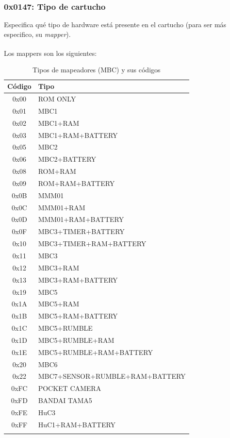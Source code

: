 \subsubsection{0x0147: Tipo de cartucho}
Especifica qué tipo de hardware está presente en el cartucho (para ser más especifico, su \textit{mapper}).
\\\\
Los mappers son los siguientes:
\begin{longtable}{|c|l|}
\hline
\textbf{Código} & \textbf{Tipo} \\
\hline
0x00 & ROM ONLY \\ \hline
0x01 & MBC1 \\ \hline
0x02 & MBC1+RAM \\ \hline
0x03 & MBC1+RAM+BATTERY \\ \hline
0x05 & MBC2 \\ \hline
0x06 & MBC2+BATTERY \\ \hline
0x08 & ROM+RAM \\ \hline
0x09 & ROM+RAM+BATTERY \\ \hline
0x0B & MMM01 \\ \hline
0x0C & MMM01+RAM \\ \hline
0x0D & MMM01+RAM+BATTERY \\ \hline
0x0F & MBC3+TIMER+BATTERY \\ \hline
0x10 & MBC3+TIMER+RAM+BATTERY \\ \hline
0x11 & MBC3 \\ \hline
0x12 & MBC3+RAM \\ \hline
0x13 & MBC3+RAM+BATTERY \\ \hline
0x19 & MBC5 \\ \hline
0x1A & MBC5+RAM \\ \hline
0x1B & MBC5+RAM+BATTERY \\ \hline
0x1C & MBC5+RUMBLE \\ \hline
0x1D & MBC5+RUMBLE+RAM \\ \hline
0x1E & MBC5+RUMBLE+RAM+BATTERY \\ \hline
0x20 & MBC6 \\ \hline
0x22 & MBC7+SENSOR+RUMBLE+RAM+BATTERY \\ \hline
0xFC & POCKET CAMERA \\ \hline
0xFD & BANDAI TAMA5 \\ \hline
0xFE & HuC3 \\ \hline
0xFF & HuC1+RAM+BATTERY \\ \hline
\caption{Tipos de mapeadores (MBC) y sus códigos} \\
\end{longtable}

